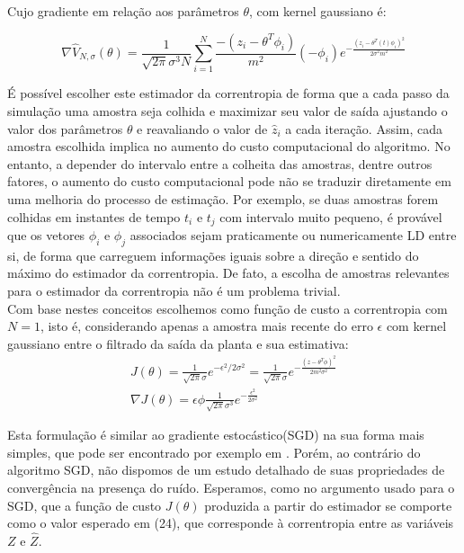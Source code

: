 \documentclass[conference,harvard,brazil,english]{sbatex}
\begin{document}
Cujo gradiente em relação aos parâmetros $\theta$, com kernel gaussiano é:

\begin{equation}
\nabla\hat{V}_{N,\sigma}(\theta) = \frac{1}{\sqrt{2\pi}\sigma^3 N}\sum_{i=1}^N \frac{-(z_i - \theta^T \phi_i)}{m^2}(-\phi_i) e^{-\frac{(z_i - \theta^T(t)\phi_i)^2}{2 \sigma^2 m^2}}
\end{equation}

É possível escolher este estimador da correntropia de forma que a cada passo da simulação uma amostra seja colhida e maximizar seu valor de saída ajustando o valor dos parâmetros $\theta$ e reavaliando o valor de $\hat{z}_i$ a cada iteração. Assim, cada amostra escolhida implica no aumento do custo computacional do algoritmo. No entanto, a depender do intervalo entre a colheita das amostras, dentre outros fatores, o aumento do custo computacional pode não se traduzir diretamente em uma melhoria do processo de estimação. Por exemplo, se duas amostras forem colhidas em instantes de tempo $t_i$ e $t_j$ com intervalo muito pequeno, é provável que os vetores $\phi_i$ e $\phi_j$ associados sejam praticamente ou numericamente LD entre si, de forma que carreguem informações iguais sobre a direção e sentido do máximo do estimador da correntropia. De fato, a escolha de amostras relevantes para o estimador da correntropia não é um problema trivial.\\  

Com base nestes conceitos escolhemos como função de custo a correntropia com $N=1$, isto é, considerando apenas a amostra mais recente do erro $\epsilon$ com kernel gaussiano entre o filtrado da saída da planta e sua estimativa:\\

\begin{equation}
 \displaystyle 
 \begin{array}{l}
 J(\theta) =\frac{1}{\sqrt{2\pi}\sigma} e^{-\epsilon^2/2\sigma^2} =\frac{1}{\sqrt{2\pi}\sigma} e^{-\frac{(z - \theta^T \phi)^2}{2 m^2 \sigma^2}}\\
 \nabla J(\theta) = \epsilon \phi \frac{1}{\sqrt{2\pi}\sigma^3} e^{-\frac{\epsilon^2}{2 \sigma^2}}        
 \end{array}
\end{equation}

Esta formulação é similar ao gradiente estocástico(SGD) na sua forma mais simples, que pode ser encontrado por exemplo em \cite{Bottou2010}. Porém, ao contrário do algoritmo SGD, não dispomos de um estudo detalhado de suas propriedades de convergência na presença do ruído. Esperamos, como no argumento usado para o SGD, que a função de custo $J(\theta)$ produzida a partir do estimador se comporte como o valor esperado em (24), que corresponde à correntropia entre as variáveis $Z$ e $\hat{Z}$.\\
\end{document}
